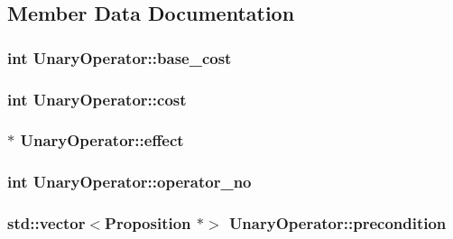 \subsection{Member Data Documentation}
\hypertarget{structUnaryOperator_a77481176cd0816de1c1ef04e823b6921}{
\subsubsection[{base\-\_\-cost}]{\setlength{\rightskip}{0pt plus 5cm}int Unary\-Operator\-::base\-\_\-cost}}\label{structUnaryOperator_a77481176cd0816de1c1ef04e823b6921}
\hypertarget{structUnaryOperator_acefd9a91627285c504c3cc1a7626d0ae}{
\subsubsection[{cost}]{\setlength{\rightskip}{0pt plus 5cm}int Unary\-Operator\-::cost}}\label{structUnaryOperator_acefd9a91627285c504c3cc1a7626d0ae}
\hypertarget{structUnaryOperator_ab8cc5c54af7d951a2cf943e142fff161}{
\subsubsection[{effect}]{$\ast$ Unary\-Operator\-::effect}}\label{structUnaryOperator_ab8cc5c54af7d951a2cf943e142fff161}
\hypertarget{structUnaryOperator_a02e00e6744c15a0789b0c268e5dda66c}{
\subsubsection[{operator\-\_\-no}]{\setlength{\rightskip}{0pt plus 5cm}int Unary\-Operator\-::operator\-\_\-no}}\label{structUnaryOperator_a02e00e6744c15a0789b0c268e5dda66c}
\hypertarget{structUnaryOperator_aaadd10ce211907ef447f2e626c1e0844}{
\subsubsection[{precondition}]{\setlength{\rightskip}{0pt plus 5cm}std\-::vector$<${\bf Proposition} $\ast$$>$ Unary\-Operator\-::precondition}}\label{structUnaryOperator_aaadd10ce211907ef447f2e626c1e0844}

